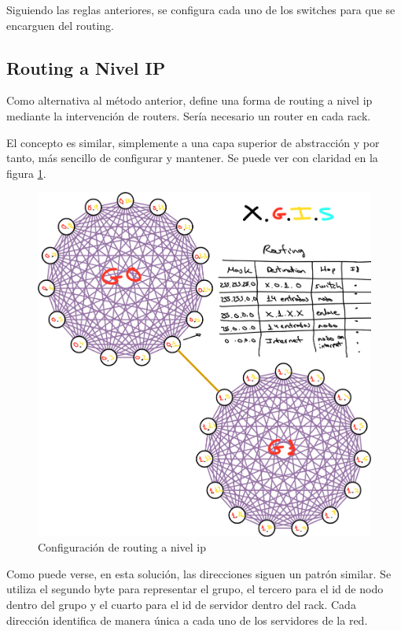 \documentclass[%
    school=etsisi,%
    degree=61TI,%
]{upm-report}
\begin{document}
Siguiendo las reglas anteriores, se configura cada uno de los switches para que se encarguen del routing.

\subsection{Routing a Nivel IP}
\label{subsec:routing-nivel-ip}

Como alternativa al método anterior, define una forma de routing a nivel ip mediante la intervención de routers. Sería necesario un router en cada rack.

El concepto es similar, simplemente a una capa superior de abstracción y por tanto, más sencillo de configurar y mantener. Se puede ver con claridad en la figura \ref{fig:ip-routing}.

\begin{figure}
    \centering
    \includegraphics[width=1.0\textwidth]{figures/routing-ip.png}
    \caption{\label{fig:ip-routing} Configuración de routing a nivel ip}
\end{figure}

Como puede verse, en esta solución, las direcciones siguen un patrón similar. Se utiliza el segundo byte para representar el grupo, el tercero para el id de nodo dentro del grupo y el cuarto para el id de servidor dentro del rack. Cada dirección identifica de manera única a cada uno de los servidores de la red.
\end{document}

